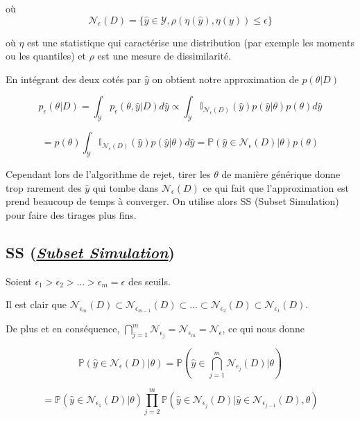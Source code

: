 \documentclass[french,12pt]{article}
\begin{document}
où $$\mathcal{N}_{\epsilon}(D) = \{\hat{y} \in \mathcal{Y}, \rho(\eta(\hat{y}), \eta(y)) \leq \epsilon\}$$


où $\eta$ est une statistique qui caractérise une distribution
(par exemple les moments ou les quantiles) et $\rho$ est une mesure de dissimilarité.

En intégrant des deux cotés par $\hat{y}$ on obtient notre approximation de $p(\theta | D)$

$$p_{\epsilon}( \theta | D) = \int_{\mathcal{Y}} p_{\epsilon}( \theta , \hat{y}| D) d \hat{y} \propto \int_{\mathcal{Y}} \mathbb{I}_{\mathcal{N}_\epsilon (D)} (\hat{y}) p( \hat{y}| \theta) p( \theta) d \hat{y}$$

$$ = p( \theta) \int_{\mathcal{Y}} \mathbb{I}_{\mathcal{N}_\epsilon (D)} (\hat{y})  p( \hat{y}| \theta) d \hat{y} = \mathbb{P} (\hat{y} \in \mathcal{N}_{\epsilon} (D)| \theta) p( \theta)$$

Cependant lors de l'algorithme de rejet, tirer les $\theta$ de manière générique donne trop rarement des $\hat{y}$ qui tombe dans $\mathcal{N}_{\epsilon} (D)$
ce qui fait que l'approximation est prend beaucoup de temps à converger. On utilise alors SS (Subset Simulation)
pour faire des tirages plus fins.

\subsection{SS (\href{https://en.wikipedia.org/wiki/Subset_simulation}{\textit{Subset Simulation}})}

Soient $\epsilon_1 > \epsilon_2 > ... >\epsilon_m = \epsilon$ des seuils.

Il est clair que $\mathcal{N}_{\epsilon_m} (D)\subset \mathcal{N}_{\epsilon_{m - 1}} (D)
    \subset ... \subset \mathcal{N}_{\epsilon_{2}} (D) \subset \mathcal{N}_{\epsilon_{1}} (D)$.

De plus et en conséquence, $\bigcap_{j = 1}^m \mathcal{N}_{\epsilon_j} = \mathcal{N}_{\epsilon_m} = \mathcal{N}_{\epsilon} $, ce qui nous donne

$$ \mathbb{P} \left(\hat{y} \in \mathcal{N}_{\epsilon} (D)| \theta \right) = \mathbb{P} \left(\hat{y} \in \bigcap_{j = 1}^m \mathcal{N}_{\epsilon_j} (D)| \theta\right)$$

$$= \mathbb{P} \left(\hat{y} \in \mathcal{N}_{\epsilon_1} (D)| \theta\right)
    \prod_{j = 2}^{m} \mathbb{P} \left(\hat{y} \in \mathcal{N}_{\epsilon_j} (D)|\hat{y} \in \mathcal{N}_{\epsilon_{j - 1}} (D), \theta\right)$$
\end{document}
